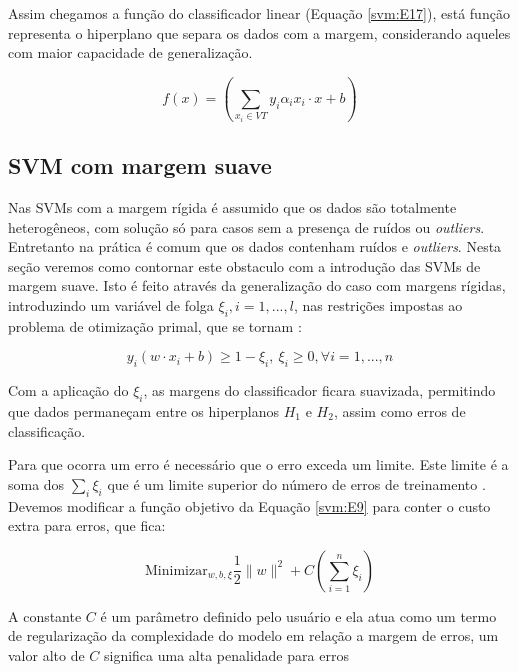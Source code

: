 Assim chegamos a função do classificador linear (Equação \ref{svm:E17}), está função representa o hiperplano que separa os dados com a margem, considerando aqueles com maior capacidade de generalização.

\begin{equation} \label{svm:E17}
f(x) = \left(\sum_{x_{i} \in VT} y_{i}\alpha_{i}x_{i} \cdot x + b \right)
\end{equation}

\subsection{SVM com margem suave}
Nas SVMs com a margem rígida é assumido que os dados são totalmente heterogêneos, com solução só para casos sem a presença de ruídos ou \textit{outliers}. Entretanto na prática é comum que os dados contenham ruídos e \textit{outliers}. Nesta seção veremos como contornar este obstaculo com a introdução das SVMs de margem suave. Isto é feito através da generalização do caso com margens rígidas, introduzindo um variável de folga $\xi_{i}, i= 1,...,l$, nas restrições impostas ao problema de otimização primal, que se tornam  \cite{Scholkopf2002}: 

\begin{equation} \label{svm:E18}
y_{i}(w \cdot x_{i} + b) \geq 1 - \xi_{i}, \  \xi_{i} \geq 0, \forall i =1,...,n
\end{equation}

Com a aplicação do $\xi_{i}$, as margens do classificador ficara suavizada, permitindo que dados permaneçam entre os hiperplanos $H_{1}$ e $H_{2}$, assim como erros de classificação.

Para que ocorra um erro é necessário que o erro exceda um limite. Este limite é a soma dos $\sum_{i} \xi_{i}$ que é um limite superior do número de erros de treinamento \cite{Burges1998Support}. Devemos modificar a função objetivo da Equação \ref{svm:E9} para conter o custo extra para erros, que fica:

\begin{equation}\label{svm:E19}
\text{Minimizar}_{w,b,\xi} \frac{1}{2}\parallel w \parallel^{2} + C \left( \sum_{i=1}^n \xi_{i}\right)
\end{equation}

A constante $C$ é um parâmetro definido pelo usuário e ela atua como um termo de regularização da complexidade do modelo em relação a margem de erros, um valor alto de $C$ significa uma alta penalidade para erros \cite{passerini04kernelmethods}

